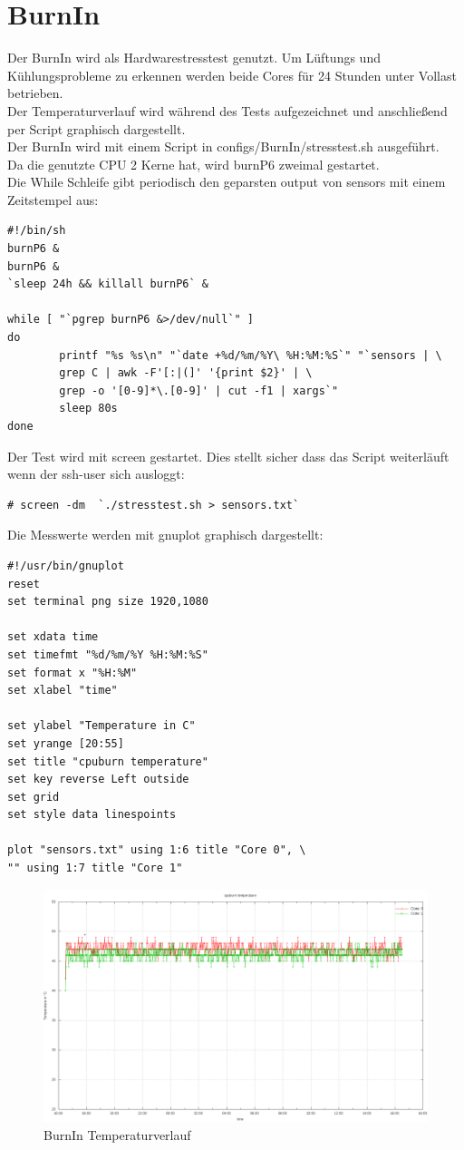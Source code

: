 \section{BurnIn}
Der BurnIn wird als Hardwarestresstest genutzt. Um Lüftungs und Kühlungsprobleme zu erkennen werden beide Cores für 24 Stunden unter Vollast betrieben.\\
Der Temperaturverlauf wird während des Tests aufgezeichnet und anschließend per Script graphisch dargestellt.\\
Der BurnIn wird mit einem Script in configs/BurnIn/stresstest.sh ausgeführt.\\
Da die genutzte CPU 2 Kerne hat, wird burnP6 zweimal gestartet.\\
Die While Schleife gibt periodisch den geparsten output von sensors mit einem Zeitstempel aus:
\begin{lstlisting}[style=Bash]
#!/bin/sh
burnP6 &
burnP6 &
`sleep 24h && killall burnP6` &

while [ "`pgrep burnP6 &>/dev/null`" ]
do
        printf "%s %s\n" "`date +%d/%m/%Y\ %H:%M:%S`" "`sensors | \
		grep C | awk -F'[:|(]' '{print $2}' | \
		grep -o '[0-9]*\.[0-9]' | cut -f1 | xargs`"
        sleep 80s
done
\end{lstlisting}
Der Test wird mit screen gestartet. Dies stellt sicher dass das Script weiterläuft wenn der ssh-user sich ausloggt:
\begin{lstlisting}[style=Bash]
# screen -dm  `./stresstest.sh > sensors.txt`
\end{lstlisting}
Die Messwerte werden mit gnuplot graphisch dargestellt:
\begin{lstlisting}[style=Bash]
#!/usr/bin/gnuplot
reset
set terminal png size 1920,1080

set xdata time
set timefmt "%d/%m/%Y %H:%M:%S"
set format x "%H:%M"
set xlabel "time"

set ylabel "Temperature in C"
set yrange [20:55]
set title "cpuburn temperature"
set key reverse Left outside
set grid
set style data linespoints

plot "sensors.txt" using 1:6 title "Core 0", \
"" using 1:7 title "Core 1"
\end{lstlisting}
\newpage
\begin{figure}[H]
	\includegraphics[scale=0.27]{../aufgabe1/BurnIn/plot.png}
	\caption{BurnIn Temperaturverlauf}
\end{figure}
